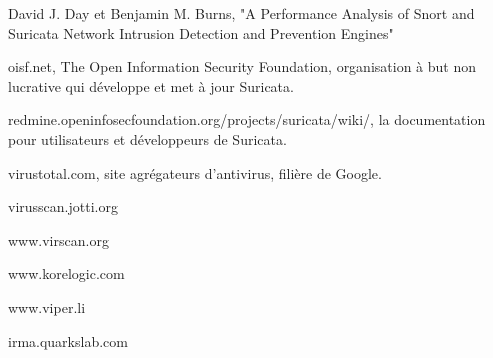 \documentclass[smallextended]{svjour3}       %
\begin{document}
\newpage
\begin{thebibliography}{}
%

David J. Day et Benjamin M. Burns, "A Performance Analysis of Snort and Suricata Network Intrusion Detection and Prevention Engines"

oisf.net, The Open Information Security Foundation, organisation à but non lucrative qui développe et met à jour Suricata.

redmine.openinfosecfoundation.org/projects/suricata/wiki/, la documentation pour utilisateurs et développeurs de Suricata.

virustotal.com, site agrégateurs d'antivirus, filière de Google.

virusscan.jotti.org

www.virscan.org

www.korelogic.com

www.viper.li

irma.quarkslab.com


\end{thebibliography}
\end{document}
